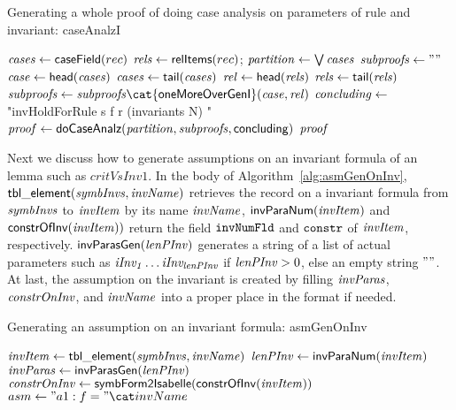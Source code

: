\begin{algorithm}[!t]
\caption{Generating a whole proof of doing case analysis on parameters of rule and invariant: caseAnalzI}\label{alg:doCaseAnalzI}
{
${\it cases} \leftarrow {\sf caseField}(rec)$\;
${\it rels} \leftarrow {\sf relItems}(rec)$;
${\it partition} \leftarrow \bigvee {\it cases}$\;
${\it subproofs} \leftarrow ""$\;
{ $ {\it case} \leftarrow {\sf head}({\it cases})$ \;
  ${\it cases} \leftarrow {\sf tail}({\it cases})$ \;
  $ {\it rel} \leftarrow {\sf head}({\it rels})$ \;
  ${\it rels} \leftarrow {\sf tail}({\it rels})$ \;
  ${\it subproofs} \leftarrow {\it subproofs} \cat {\sf oneMoreOverGenI}({\it case},{\it rel})$\;
  }
${\it concluding} \leftarrow $"invHoldForRule s f r (invariants N) "\;
${\it proof} \leftarrow {\sf doCaseAnalz}({\it partition},{\it subproofs},{\sf concluding})$\;
\Return ${\it proof}$
}
\end{algorithm}

Next we discuss how to generate assumptions on an invariant formula of an lemma such as $critVsInv1$.
In the body of Algorithm~\ref{alg:asmGenOnInv},
${\sf tbl\_element}({\it symbInvs}, {\it invName})$  retrieves the record on a invariant formula from
${\it symbInvs}$ to ${\it invItem}$
by its name ${\it invName}$, ${\sf invParaNum}({\it invItem})$
and ${\sf constrOfInv}({\it invItem}))$ return the field ${\tt invNumFld}$ and ${\tt constr}$ of  ${\it invItem}$, respectively.
${\sf invParasGen}({\it lenPInv})$ generates a string of a list of actual parameters such as
${\it iInv_1} \ldots {\it iInv_{lenPInv}}$ if ${\it lenPInv}>0$,
else an empty string $""$.
At last, the assumption on the invariant is created by filling ${\it invParas}$,
${\it constrOnInv}$, and ${\it invName}$ into a proper place in the format if needed.

\begin{algorithm}[!t]
\caption{Generating an assumption on an invariant formula: asmGenOnInv}\label{alg:asmGenOnInv}

${\it invItem} \leftarrow {\sf tbl\_element}( {\it symbInvs}, {\it invName})$\;
${\it lenPInv} \leftarrow {\sf invParaNum}({\it invItem})$\;
${\it invParas} \leftarrow {\sf invParasGen}({\it lenPInv})$\;
${\it constrOnInv} \leftarrow {\sf symbForm2Isabelle}({\sf constrOfInv}({\it invItem}))  $\;
  {$asm  \leftarrow  "a1: f="\cat invName   $\;}
\end{algorithm}

